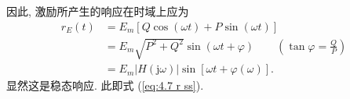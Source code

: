 因此, 激励所产生的响应在时域上应为
\begin{equation}
    \begin{aligned}
        r_E(t) & =E_m[Q\cos(\omega t)+P\sin(\omega t)]                                                \\
               & =E_m\sqrt{P^2+Q^2}\sin(\omega t+\varphi) \qquad \left(\tan\varphi=\frac{Q}{P}\right) \\
               & =E_m|H(\mathrm{j}\omega)|\sin[\omega t+\varphi(\omega)].
    \end{aligned}
\end{equation}
显然这是稳态响应. 此即式 (\ref{eq:4.7 r ss}).
